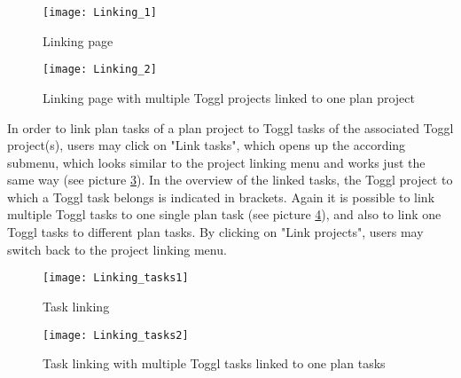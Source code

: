 \begin{figure}[H]
	\centering
	\texttt{[image: Linking\_1]}
	\caption{Linking page}
	\label{Linking init}
\end{figure}

\begin{figure}[H]
	\centering
	\texttt{[image: Linking\_2]}
	\caption{Linking page with multiple Toggl projects linked to one plan project}
	\label{Linking multiple}
\end{figure}

In order to link plan tasks of a plan project to Toggl tasks of the associated Toggl project(s), users may click on "Link tasks", which opens up the according submenu, which looks similar to the project linking menu and works just the same way (see picture \ref{Linking tasks init}). In the overview of the linked tasks, the Toggl project to which a Toggl task belongs is indicated in brackets. Again it is possible to link multiple Toggl tasks to one single plan task (see picture \ref{Linking tasks multiple}), and also to link one Toggl tasks to different plan tasks. By clicking on "Link projects", users may switch back to the project linking menu.

\begin{figure}[H]
	\centering
	\texttt{[image: Linking\_tasks1]}
	\caption{Task linking}
	\label{Linking tasks init}
\end{figure}

\begin{figure}[H]
	\centering
	\texttt{[image: Linking\_tasks2]}
	\caption{Task linking with multiple Toggl tasks linked to one plan tasks}
	\label{Linking tasks multiple}
\end{figure}